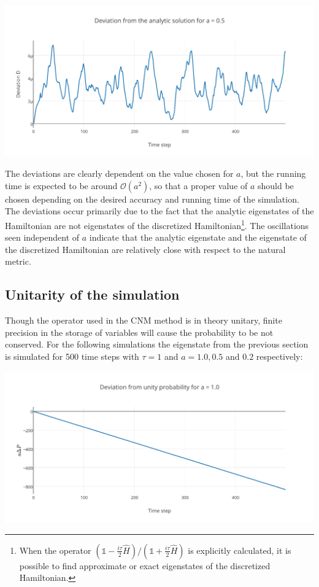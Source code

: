 \begin{Figure}
    \centering
    \includegraphics[width=\linewidth]{distancea02.pdf}
    \label{fig:distancea02}
\end{Figure} The deviations are clearly dependent on the value chosen for $a$, but the running time is expected to be around $\mathcal{O}(a^2)$, so that a proper value of $a$ should be chosen depending on the desired accuracy and running time of the simulation. The deviations occur primarily due to the fact that the analytic eigenstates of the Hamiltonian are not eigenstates of the discretized Hamiltonian\footnote{When the operator $(\mathbb{1}-\frac{i\tau}{2}\hat{H})/(\mathbb{1}+\frac{i\tau}{2}\hat{H})$ is explicitly calculated, it is possible to find approximate or exact eigenstates of the discretized Hamiltonian.}. The oscillations seen independent of $a$ indicate that the analytic eigenstate and the eigenstate of the discretized Hamiltonian are relatively close with respect to the natural metric.

\subsection*{Unitarity of the simulation}
Though the operator used in the CNM method is in theory unitary, finite precision in the storage of variables will cause the probability to be not conserved. For the following simulations the eigenstate from the previous section is simulated for 500 time steps with $\tau = 1$ and $a = 1.0, 0.5$ and $0.2$ respectively:

\begin{Figure}
    \centering
    \includegraphics[width=\linewidth]{norma10.pdf}
    \label{fig:distancea10}
\end{Figure}

